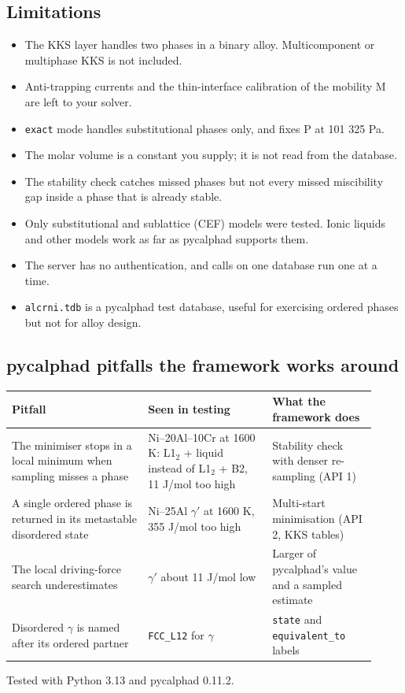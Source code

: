 \documentclass[12pt,a4paper]{article}
\begin{document}
\subsection*{Limitations}
\begin{itemize}
\item The KKS layer handles two phases in a binary alloy. Multicomponent or multiphase KKS is not included.
\item Anti-trapping currents and the thin-interface calibration of the mobility M are left to your solver.
\item \texttt{exact} mode handles substitutional phases only, and fixes P at 101 325 Pa.
\item The molar volume is a constant you supply; it is not read from the database.
\item The stability check catches missed phases but not every missed miscibility gap inside a phase that is already stable.
\item Only substitutional and sublattice (CEF) models were tested. Ionic liquids and other models work as far as pycalphad supports them.
\item The server has no authentication, and calls on one database run one at a time.
\item \texttt{alcrni.\allowbreak{}tdb} is a pycalphad test database, useful for exercising ordered phases but not for alloy design.
\end{itemize}

\subsection*{pycalphad pitfalls the framework works around}
\begingroup\small
\begin{longtable}{>{\raggedright\arraybackslash}p{0.343\linewidth}>{\raggedright\arraybackslash}p{0.313\linewidth}>{\raggedright\arraybackslash}p{0.265\linewidth}}
\toprule
\textbf{Pitfall} & \textbf{Seen in testing} & \textbf{What the framework does} \\
\midrule
\endhead
The minimiser stops in a local minimum when sampling misses a phase & Ni--20Al--10Cr at 1600 K: L1\(_{2}\) + liquid instead of L1\(_{2}\) + B2, 11 J/mol too high & Stability check with denser re-sampling (API 1) \\
A single ordered phase is returned in its metastable disordered state & Ni--25Al \(\gamma '\) at 1600 K, 355 J/mol too high & Multi-start minimisation (API 2, KKS tables) \\
The local driving-force search underestimates & \(\gamma '\) about 11 J/mol low & Larger of pycalphad's value and a sampled estimate \\
Disordered \(\gamma\) is named after its ordered partner & \texttt{FCC\_\allowbreak{}L12} for \(\gamma\) & \texttt{state} and \texttt{equivalent\_\allowbreak{}to} labels \\
\bottomrule
\end{longtable}
\endgroup
Tested with Python 3.13 and pycalphad 0.11.2.
\end{document}
